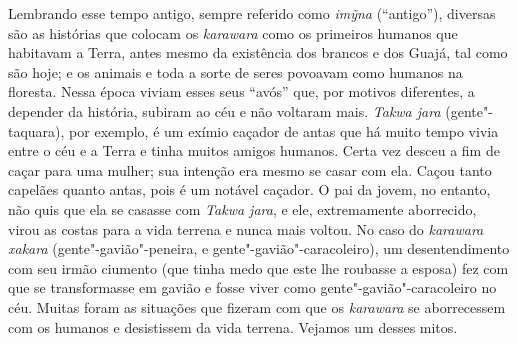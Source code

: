 Lembrando esse tempo antigo, sempre referido como \emph{imỹna}
(``antigo''), diversas são as histórias que colocam os \emph{karawara}
como os primeiros humanos que habitavam a Terra, antes mesmo da
existência dos brancos e dos Guajá, tal como são hoje; e os animais e
toda a sorte de seres povoavam como humanos na floresta. Nessa época
viviam esses seus ``avós'' que, por motivos diferentes, a depender da
história, subiram ao céu e não voltaram mais. \emph{Takwa jara}
(gente"-taquara), por exemplo, é um exímio caçador de antas que há muito
tempo vivia entre o céu e a Terra e tinha muitos amigos humanos. Certa
vez desceu a fim de caçar para uma mulher; sua intenção era mesmo se
casar com ela. Caçou tanto capelães quanto antas, pois é um notável
caçador. O pai da jovem, no entanto, não quis que ela se casasse com
\emph{Takwa jara}, e ele, extremamente aborrecido, virou as costas para
a vida terrena e nunca mais voltou. No caso do \emph{karawara}
\emph{xakara} (gente"-gavião"-peneira, e gente"-gavião"-caracoleiro), um
desentendimento com seu irmão ciumento (que tinha medo que este lhe
roubasse a esposa) fez com que se transformasse em gavião e fosse viver
como gente"-gavião"-caracoleiro no céu. Muitas foram as situações que
fizeram com que os \emph{karawara} se aborrecessem com os humanos e
desistissem da vida terrena. Vejamos um desses mitos.

